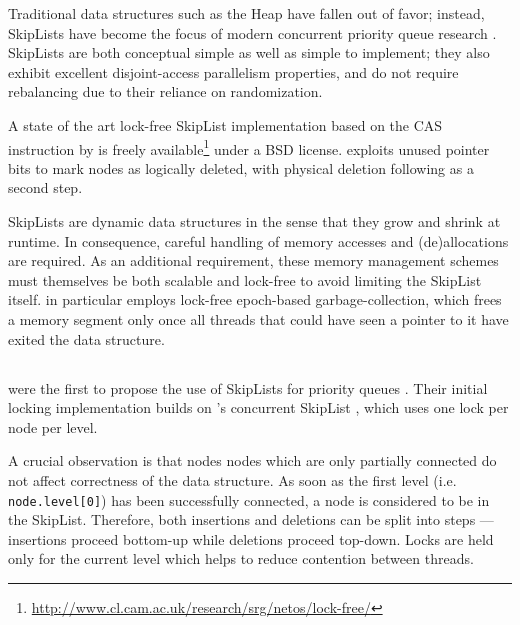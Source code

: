 \documentclass[a4paper,10pt]{article}
\begin{document}
Traditional data structures such as the Heap have fallen out of favor;
instead, SkipLists \cite{pugh1990skip,pugh1998concurrent} have become the focus
of modern concurrent priority queue research
\cite{shavit2000skiplist,sundell2003fast,herlihy2012art,linden2013skiplist,alistarhspraylist}.
SkipLists are both conceptual simple as well as simple to implement; they also exhibit
excellent disjoint-access parallelism properties, and do not require rebalancing due to their
reliance on randomization.

A state of the art lock-free SkipList implementation based on the \ac{CAS} instruction
by \citeauthor{fraser2004practical} \cite{fraser2004practical} is freely available\footnote{
\url{http://www.cl.cam.ac.uk/research/srg/netos/lock-free/}} under a BSD license.
\citeauthor{fraser2004practical} exploits unused pointer bits to mark nodes as logically
deleted, with physical deletion following as a second step.

SkipLists are dynamic data structures in the sense that they grow and shrink
at runtime. In consequence, careful handling of memory accesses and (de)allocations
are required. As an additional requirement, these memory management schemes must
themselves be both scalable and lock-free to avoid limiting the SkipList itself.
\citeauthor{fraser2004practical} in particular employs lock-free epoch-based garbage-collection,
which frees a memory segment only once all threads that could have seen a pointer to it have
exited the data structure.


\subsection{\citeauthor{shavit2000skiplist}} \label{sec:shavit}

\citeauthor{shavit2000skiplist} were the first to propose the use of SkipLists
for priority queues \cite{linden2013skiplist}. Their initial locking implementation
\cite{shavit2000skiplist} builds on \citeauthor{pugh1998concurrent}'s concurrent
SkipList \cite{pugh1998concurrent}, which uses one lock per node per level.


A crucial observation is that nodes nodes which are only partially connected
do not affect correctness of the data structure. As soon as the first level (i.e. \lstinline|node.level[0]|)
has been successfully connected, a node is considered to be in the SkipList.
Therefore, both insertions and deletions can be split into steps --- insertions
proceed bottom-up while deletions proceed top-down. Locks are held only for the current level
which helps to reduce contention between threads.
\end{document}
